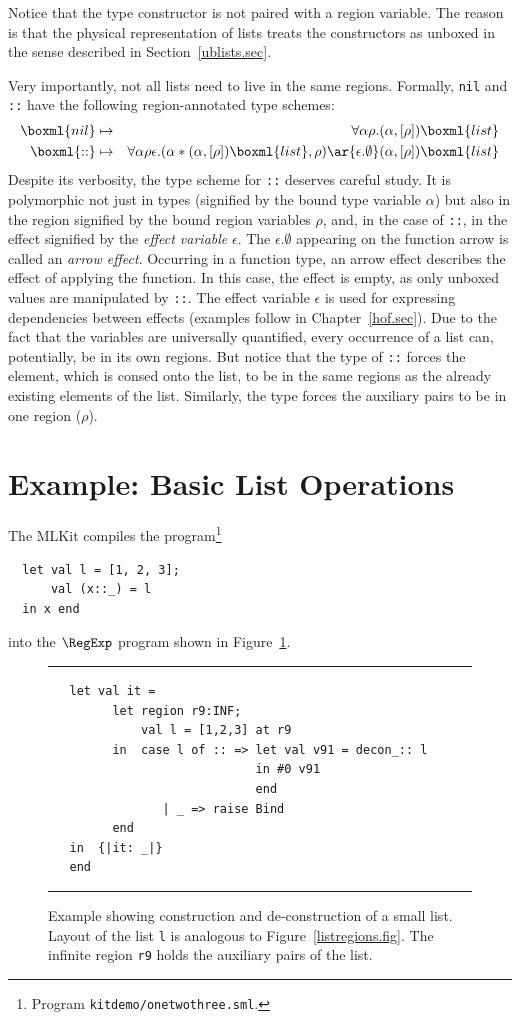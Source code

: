 \documentclass[12pt]{book}
\begin{document}
Notice that the  type constructor is not paired with a
region variable.  The reason is that the physical representation of
lists treats the constructors as unboxed in the sense described in
Section~\ref{ublists.sec}.

Very importantly, not all lists need to live in the same regions.
Formally, {\tt nil} and {\tt ::} have the following region-annotated
type schemes:
\begin{eqnarray*}
\boxml{nil} & \mapsto & \forall\alpha\rho.(\alpha,[\rho])\boxml{list}\\
\boxml{::}  & \mapsto & \forall\alpha\rho\epsilon.(\alpha\ast(\alpha,[\rho])\boxml{list},\rho)
\ar{\epsilon.\emptyset} (\alpha,[\rho])\boxml{list}
\end{eqnarray*}
Despite its verbosity, the type scheme for {\tt ::} deserves careful
study. It is polymorphic not just in types (signified by the bound
type variable $\alpha$) but also in the region signified by the bound
region variables $\rho$, and, in the case of \texttt{::}, in the effect signified by the
%
\emph{effect variable} $\epsilon$.
The $\epsilon.\emptyset$ appearing on the function arrow is called an
%
{\em arrow effect}.  Occurring in a function type, an arrow effect
describes the effect of applying the function.  In this case, the
effect is empty, as only unboxed values are manipulated by {\tt ::}.
The effect variable $\epsilon$ is used for expressing dependencies
between effects (examples follow in Chapter~\ref{hof.sec}). Due to the
fact that the variables are universally quantified, every occurrence
of a list can, potentially, be in its own regions. But notice that the
type of {\tt ::} forces the element, which is consed onto the list, to
be in the same regions as the already existing elements of the list.
Similarly, the type forces the auxiliary pairs to be in one region
($\rho$).

\section{Example: Basic List Operations}
\label{listexamples.sec}
The MLKit compiles the program\footnote{Program \texttt{kitdemo/onetwothree.sml}.}
\begin{verbatim}
  let val l = [1, 2, 3];
      val (x::_) = l
  in x end
\end{verbatim} 
into the $\RegExp$ program shown in Figure~\ref{listprint.fig}.
\begin{figure}
\hrule \medskip
\begin{verbatim}
   let val it =
         let region r9:INF;
             val l = [1,2,3] at r9
         in  case l of :: => let val v91 = decon_:: l
                             in #0 v91
                             end
                | _ => raise Bind
         end
   in  {|it: _|}
   end
\end{verbatim}
\caption{Example showing construction and de-construction of a small list.
Layout of the list {\tt l} is analogous to Figure~\ref{listregions.fig}.
The infinite region {\tt r9} holds the auxiliary pairs of the list.
}
\label{listprint.fig}
\medskip

\hrule
\end{figure}
\end{document}
